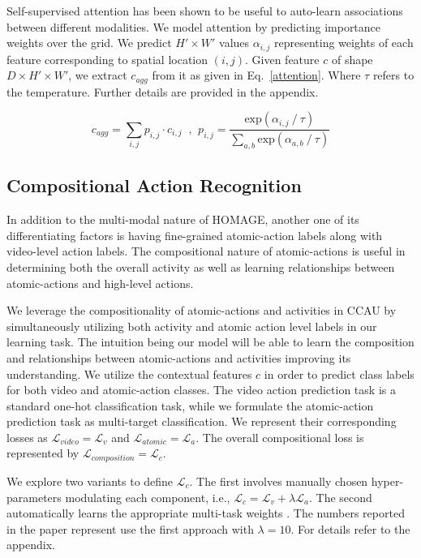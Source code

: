 \documentclass[final]{cvpr}
\begin{document}
Self-supervised attention \cite{multisensory2018} has been shown to be useful to auto-learn associations between different modalities. We model attention by predicting importance weights over the grid. We predict $H' \times W'$ values $\alpha_{i, j}$ representing weights of each feature corresponding to spatial location $(i, j)$. Given feature $c$ of shape $D \times H' \times W'$, we extract $c_{agg}$ from it as given in Eq.~\eqref{attention}. Where $\tau$ refers to the temperature. Further details are provided in the appendix.

\begin{equation}
    \label{attention}
    c_{agg} = \sum_{i, j} p_{i, j} \cdot c_{i, j} \;\; \text{,} \;\; p_{i, j} = \frac{\text{exp}(\alpha_{i, j} \mathbin{/} \tau)}{\sum_{a, b} \text{exp}(\alpha_{a, b} \mathbin{/} \tau)}
\end{equation}

\subsection{Compositional Action Recognition}

\label{compose}

In addition to the multi-modal nature of HOMAGE, another one of its differentiating factors is having fine-grained atomic-action labels along with video-level action labels. The compositional nature of atomic-actions is useful in determining both the overall activity as well as learning relationships between atomic-actions and high-level actions.

We leverage the compositionality of atomic-actions and activities in CCAU by simultaneously utilizing both activity and atomic action level labels in our learning task. The intuition being our model will be able to learn the composition and relationships between atomic-actions and activities improving its understanding. We utilize the contextual features $c$ in order to predict class labels for both video and atomic-action classes. The video action prediction task is a standard one-hot classification task, while we formulate the atomic-action prediction task as multi-target classification. We represent their corresponding losses as $\mathcal{L}_{video} = \mathcal{L}_{v}$ and $\mathcal{L}_{atomic} = \mathcal{L}_{a}$. The overall compositional loss is represented by $\mathcal{L}_{composition} = \mathcal{L}_{c}$.

We explore two variants to define $\mathcal{L}_{c}$. The first involves manually chosen hyper-parameters modulating each component, i.e., $\mathcal{L}_{c} = \mathcal{L}_{v} + \lambda \mathcal{L}_{a}$. The second automatically learns the appropriate multi-task weights \cite{kendall2018multi}. The numbers reported in the paper represent use the first approach with $\lambda = 10$. For details refer to the appendix.
\end{document}
